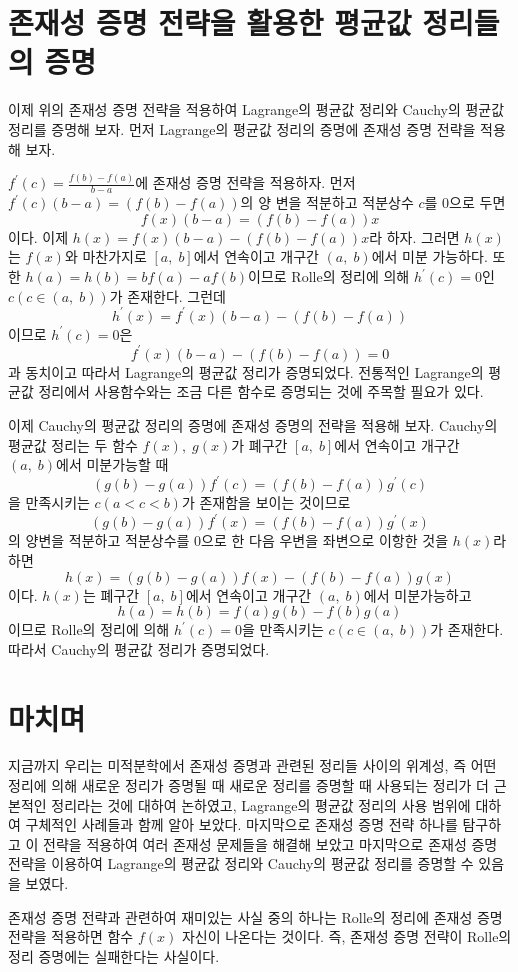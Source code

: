 \documentclass[a4paper]{article}
\begin{document}
\section{존재성 증명 전략을 활용한 평균값 정리들의 증명}

이제 위의 존재성 증명 전략을 적용하여 Lagrange의 평균값 정리와 Cauchy의 평균값 정리를 증명해 보자. 먼저 Lagrange의 평균값 정리의 증명에 존재성 증명 전략을 적용해 보자. 

$f^{\prime}(c)=\frac{f(b)-f(a)}{b-a}$에 존재성 증명 전략을 적용하자. 먼저 $f^{\prime}(c)(b-a) = (f(b)-f(a))$의 양 변을 적분하고 적분상수 $c$를 $0$으로 두면 
\[
f(x)(b-a) = (f(b)-f(a)) x
\]
이다. 이제 $h(x) = f(x)(b-a)-(f(b)-f(a))x$라 하자. 그러면 $h(x)$는 $f(x)$와 마찬가지로 $\left[a, \;b\right]$에서 연속이고 개구간 $\left(a, \; b\right)$에서 미분 가능하다. 또한 $h(a)=h(b)=bf(a)-af(b)$이므로 Rolle의 정리에 의해 $h^{\prime}(c)=0$인 $c(c \in \left(a, \;b\right))$가 존재한다. 그런데
\[
h^{\prime}(x) = f^{\prime}(x)(b-a) - (f(b)-f(a))
\]
이므로 $h^{\prime}(c)=0$은
\[
 f^{\prime}(x)(b-a) - (f(b)-f(a)) =0
\]
과 동치이고 따라서 Lagrange의 평균값 정리가 증명되었다. 전통적인 Lagrange의 평균값 정리에서 사용함수와는 조금 다른 함수로 증명되는 것에 주목할 필요가 있다.

이제 Cauchy의 평균값 정리의 증명에 존재성 증명의 전략을 적용해 보자. Cauchy의 평균값 정리는 
	두 함수 $f(x), \;g(x)$가 폐구간 $[a, \; b]$에서 연속이고 개구간 $(a, \; b)$에서 미분가능할 때
\[
(g(b)-g(a))f^{\prime}(c) = (f(b)-f(a))g^{\prime}(c)
\]
을 만족시키는  $c(a<c<b)$가 존재함을 보이는 것이므로
\[
(g(b)-g(a))f^{\prime}(x) = (f(b)-f(a))g^{\prime}(x)
\]
의 양변을 적분하고 적분상수를 $0$으로 한 다음 우변을 좌변으로 이항한 것을 $h(x)$라 하면
\[
h(x) = (g(b)-g(a))f(x) - (f(b)-f(a))g(x)
\]
이다. $h(x)$는 폐구간 $[a, \; b]$에서 연속이고 개구간 $(a, \; b)$에서 미분가능하고
\[
h(a) =h(b) = f(a)g(b) - f(b)g(a)
\]
이므로 Rolle의 정리에 의해 $h^{\prime}(c)=0$을 만족시키는 $c\left(c \in \left(a, \; b\right)\right)$가 존재한다. 따라서 Cauchy의 평균값 정리가 증명되었다.

\section{마치며}

지금까지 우리는 미적분학에서 존재성 증명과 관련된 정리들 사이의 위계성, 즉 어떤 정리에 의해 새로운 정리가 증명될 때 새로운 정리를 증명할 때 사용되는 정리가 더 근본적인 정리라는 것에 대하여 논하였고, Lagrange의 평균값 정리의 사용 범위에 대하여 구체적인 사례들과 함께 알아 보았다. 마지막으로 존재성 증명 전략 하나를 탐구하고 이 전략을 적용하여 여러 존재성 문제들을 해결해 보았고 마지막으로 존재성 증명 전략을 이용하여 Lagrange의 평균값 정리와 Cauchy의 평균값 정리를 증명할 수 있음을 보였다. 

존재성 증명 전략과 관련하여 재미있는 사실 중의 하나는 Rolle의 정리에 존재성 증명 전략을 적용하면 함수 $f(x)$ 자신이 나온다는 것이다. 즉, 존재성 증명 전략이 Rolle의 정리 증명에는 실패한다는 사실이다. 
\end{document}
